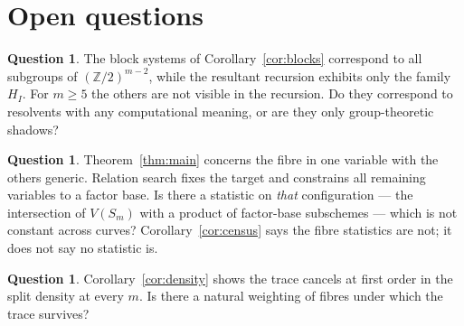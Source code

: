 \documentclass[11pt,a4paper]{article}
\theoremstyle{plain}
\theoremstyle{definition}
\newtheorem{question}[theorem]{Question}
\newcommand{\ZZ}{\mathbb{Z}}
\begin{document}
\section{Open questions}

\begin{question}
The block systems of Corollary~\ref{cor:blocks} correspond to all subgroups of
$(\ZZ/2)^{m-2}$, while the resultant recursion exhibits only the family $H_I$. For
$m \ge 5$ the others are not visible in the recursion. Do they correspond to
resolvents with any computational meaning, or are they only group-theoretic
shadows?
\end{question}

\begin{question}
Theorem~\ref{thm:main} concerns the fibre in one variable with the others generic.
Relation search fixes the target and constrains all remaining variables to a
factor base. Is there a statistic on \emph{that} configuration --- the
intersection of $V(S_m)$ with a product of factor-base subschemes --- which is not
constant across curves? Corollary~\ref{cor:census} says the fibre statistics are
not; it does not say no statistic is.
\end{question}

\begin{question}
Corollary~\ref{cor:density} shows the trace cancels at first order in the split
density at every $m$. Is there a natural weighting of fibres under which the trace
survives?
\end{question}
\end{document}
